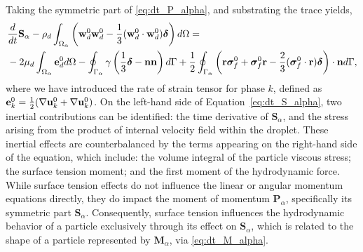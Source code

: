 Taking the symmetric part of \ref{eq:dt_P_alpha}, and substrating the trace yields, 
\begin{align}
    &\ddt {\textbf{S}_\alpha}
    - \rho_d\intO{\left(\textbf{w}_d^0 \textbf{w}_d^0 -\frac{1}{3} (\textbf{w}_d^0 \cdot  \textbf{w}_d^0)\bm\delta\right)}
    = \nonumber \\
    &- 2\mu_d\intO{\textbf{e}_d^0}
    -  \intS{ \gamma
        \left( \frac{1}{3}\bm\delta - \textbf{nn} \right)
    }
    + \frac{1}{2}\intS{\left(\textbf{r}\bm\sigma_f^0+\bm\sigma_f^0\textbf{r}-\frac{2}{3}(\bm\sigma_f^0 \cdot \textbf{r})\bm\delta \right)\cdot \textbf{n}},
    \label{eq:dt_S_alpha}
\end{align}
where we have introduced the rate of strain tensor for phase \( k \), defined as \( \mathbf{e}_k^0 = \frac{1}{2} (\mathbf{\nabla} \mathbf{u}_k^0 + \mathbf{\nabla} \mathbf{u}_k^0) \). 
On the left-hand side of Equation~\ref{eq:dt_S_alpha}, two inertial contributions can be identified: the time derivative of $\mathbf{S}_\alpha$, and the stress arising from the product of internal velocity field within the droplet. 
These inertial effects are counterbalanced by the terms appearing on the right-hand side of the equation, which include: the volume integral of the particle viscous stress; the surface tension moment; and the first moment of the hydrodynamic force.
While surface tension effects do not influence the linear or angular momentum equations directly, they do impact the moment of momentum $\textbf{P}_\alpha$, specifically its symmetric part $\textbf{S}_\alpha$.
Consequently, surface tension influences the hydrodynamic behavior of a particle exclusively through its effect on $\textbf{S}_\alpha$, which is related to the shape of a particle represented by $\textbf{M}_\alpha$, via \ref{eq:dt_M_alpha}.

